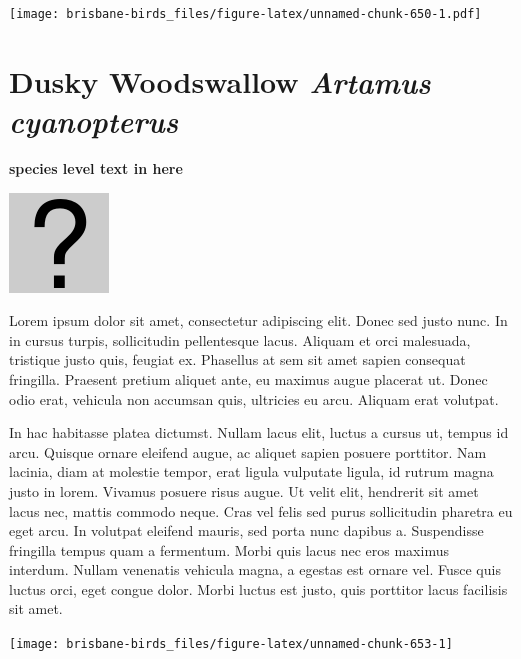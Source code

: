 \documentclass[]{book}
\let\origfigure\figure
\let\endorigfigure\endfigure
\renewenvironment{figure}[1][2] {
  \expandafter\origfigure\expandafter[H]
} {
  \endorigfigure
}
\begin{document}
\begin{figure}
\centering
\texttt{[image: brisbane-birds\_files/figure-latex/unnamed-chunk-650-1.pdf]}
\caption{\label{fig:unnamed-chunk-650}insert figure caption}
\end{figure}

\section{\texorpdfstring{Dusky Woodswallow \emph{Artamus
cyanopterus}}{Dusky Woodswallow Artamus cyanopterus}}\label{dusky-woodswallow-artamus-cyanopterus}

\textbf{species level text in here}

\begin{figure}
\centering
\includegraphics{assets/missing.png}
\caption{No image for species}
\end{figure}

Lorem ipsum dolor sit amet, consectetur adipiscing elit. Donec sed justo
nunc. In in cursus turpis, sollicitudin pellentesque lacus. Aliquam et
orci malesuada, tristique justo quis, feugiat ex. Phasellus at sem sit
amet sapien consequat fringilla. Praesent pretium aliquet ante, eu
maximus augue placerat ut. Donec odio erat, vehicula non accumsan quis,
ultricies eu arcu. Aliquam erat volutpat.

In hac habitasse platea dictumst. Nullam lacus elit, luctus a cursus ut,
tempus id arcu. Quisque ornare eleifend augue, ac aliquet sapien posuere
porttitor. Nam lacinia, diam at molestie tempor, erat ligula vulputate
ligula, id rutrum magna justo in lorem. Vivamus posuere risus augue. Ut
velit elit, hendrerit sit amet lacus nec, mattis commodo neque. Cras vel
felis sed purus sollicitudin pharetra eu eget arcu. In volutpat eleifend
mauris, sed porta nunc dapibus a. Suspendisse fringilla tempus quam a
fermentum. Morbi quis lacus nec eros maximus interdum. Nullam venenatis
vehicula magna, a egestas est ornare vel. Fusce quis luctus orci, eget
congue dolor. Morbi luctus est justo, quis porttitor lacus facilisis sit
amet.

\begin{figure}
\texttt{[image: brisbane-birds\_files/figure-latex/unnamed-chunk-653-1]} \caption{insert figure caption}\label{fig:unnamed-chunk-653}
\end{figure}
\end{document}
